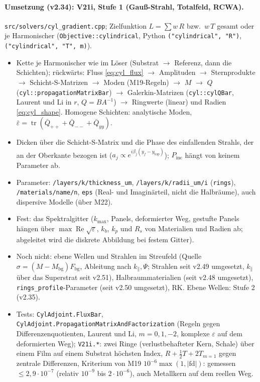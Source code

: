 \paragraph{Umsetzung (v2.34): V21i, Stufe 1 (Gauß-Strahl, Totalfeld, RCWA).}
\verb|src/solvers/cyl_gradient.cpp|; Zielfunktion $L=\sum w\,R$ bzw.\ $w\,T$ gesamt oder je Harmonischer
(\verb|Objective::cylindrical|, Python \verb|("cylindrical", "R")|, \verb|("cylindrical", "T", m)|).
\begin{itemize}[nosep]
  \item Kette je Harmonischer wie im Löser (Substrat $\to$ Referenz, dann die Schichten); rückwärts: Fluss
        \eqref{eq:cyl_flux} $\to$ Amplituden $\to$ Sternprodukte $\to$ Schicht-S-Matrizen $\to$ Moden (M19-Regeln) $\to$
        $M$ $\to$ $Q$ (\verb|cyl::propagationMatrixBar|) $\to$ Galerkin-Matrizen (\verb|cyl::cylQBar|, Laurent und Li in
        $r$, $Q=BA^{-1}$) $\to$ Ringwerte (linear) und Radien \eqref{eq:cyl_shape}. Homogene Schichten: analytische
        Moden, $\bar\varepsilon=\operatorname{tr}(\bar Q_{++}+\bar Q_{--}+\bar Q_{yy})$.
  \item Dicken über die Schicht-S-Matrix und die Phase des einfallenden Strahls, der an der Oberkante bezogen ist
        ($a_j\propto e^{i\beta_j(y_f-y_{\text{top}})}$); $P_{\text{inc}}$ hängt von keinem Parameter ab.
  \item Parameter: \verb|/layers/k/thickness_um|, \verb|/layers/k/radii_um/i| (\verb|rings|),
        \verb|/materials/name/n|, \verb|eps| (Real- und Imaginärteil, nicht die Halbräume), auch dispersive Modelle
        (über M22).
  \item Fest: das Spektralgitter ($k_{\max}$, Panels, deformierter Weg, gestufte Panels hängen über
        $\max\operatorname{Re}\sqrt\varepsilon$, $k_b$, $k_p$ und $R_s$ von Materialien und Radien ab; abgeleitet wird
        die diskrete Abbildung bei festem Gitter).
  \item Noch nicht: ebene Wellen und Strahlen im Streufeld (Quelle $\sigma=(M-M_{\text{bg}})F_{\text{bg}}$, Ableitung
        nach $k_\parallel,\Psi$; Strahlen seit v2.49 umgesetzt, $k_\parallel$ über das Superstrat seit v2.51), Halbraummaterialien (seit v2.48 umgesetzt), \verb|rings_profile|-Parameter (seit v2.50 umgesetzt), RK. Ebene
        Wellen: Stufe 2 (v2.35).
  \item Tests: \verb|CylAdjoint.FluxBar|, \verb|CylAdjoint.PropagationMatrixAndFactorization| (Regeln gegen
        Differenzenquotienten, Laurent und Li, $m=0,1,-2$, komplexe $\varepsilon$ auf dem deformierten Weg);
        \verb|V21i.*|: zwei Ringe (verlustbehafteter Kern, Schale) über einem Film auf einem Substrat höchsten
        Index, $R+\tfrac12T+2T_{m=1}$ gegen zentrale Differenzen, Kriterium von M19 $10^{-6}\max(1,|\text{fd}|)$:
        gemessen $\le2{,}9\cdot10^{-7}$ (relativ $10^{-9}$ bis $2\cdot10^{-6}$), auch Metallkern auf dem reellen Weg.
\end{itemize}

